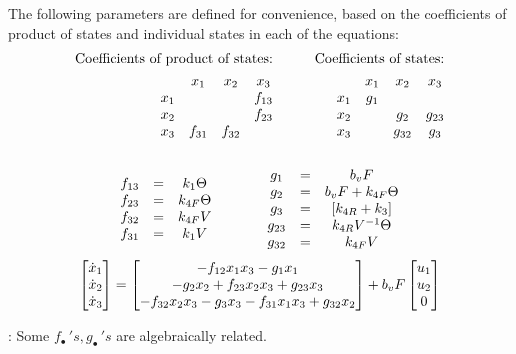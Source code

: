 The following parameters are defined for convenience, based on the coefficients
of product of states and individual states in each of the equations:
\begin{align*}
    \text{Coefficients of product of states:} &\qquad& \text{Coefficients of states:}\\
    \begin{matrix}    & x_1    & x_2      & x_3    \\
        x_1 &        &          & f_{13} \\
        x_2 &        &          & f_{23} \\
        x_3 & f_{31} & f_{32}   & \end{matrix}
    &\qquad &
    \begin{matrix}     & x_1    & x_2      & x_3    \\
        x_1  & g_1    &          &        \\
        x_2  &        & g_{2}    & g_{23} \\
        x_3  &        & g_{32}   & g_{3} \end{matrix}
\end{align*}
\begin{align*}
    \begin{matrix} 
    \\f_{13} &=& k_1 \Theta
    \\f_{23} &=& k_{4F} \Theta
    \\f_{32} &=& k_{4F} V
    \\f_{31} &=& k_1 V
     \end{matrix}
    \qquad \qquad
    \begin{matrix} 
    \\ g_1    &=& b_v F
    \\ g_2    &=& b_v F + k_{4F} \Theta
    \\ g_{3}  &=& [k_{4R}+k_3]
    \\ g_{23} &=& k_{4R} V^{-1} \Theta
    \\ g_{32} &=& k_{4F} V
     \end{matrix}
\end{align*}
\begin{equation}\label{eqn::parm_model_theta}
     \begin{bmatrix} \dot x_1 \\
        \dot x_2\\
        \dot x_3\\
         \end{bmatrix} =
    \begin{bmatrix} 
        -f_{12} x_1 x_3
        -g_1 x_1
        \\
        -g_2 x_2
        + f_{23} x_2 x_3
        + g_{23} x_3
        \\
        -f_{32} x_2 x_3
        -g_3 x_3
        -f_{31} x_1 x_3
        + g_{32} x_2
     \end{bmatrix}
    + b_v F \begin{bmatrix} u_1 \\ u_2 \\ 0 \end{bmatrix}
\end{equation}

: Some $f_{\bullet}\,'s, g_{\bullet}\,'s$ are algebraically related.

